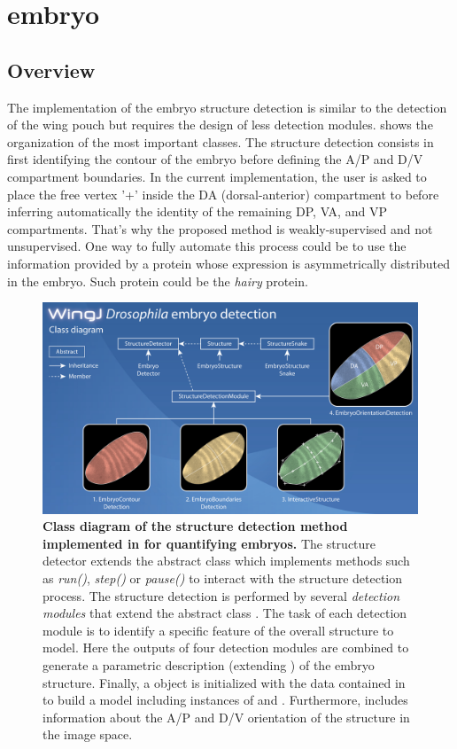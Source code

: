 \clearpage
\section{\droso embryo}
\subsection{Overview}
The implementation of the \droso embryo structure detection is similar to the detection of the wing pouch but requires the design of less detection modules.  shows the organization of the most important classes. The structure detection consists in first identifying the contour of the embryo before defining the A/P and D/V compartment boundaries. In the current implementation, the user is asked to place the free vertex '+' inside the DA (dorsal-anterior) compartment to before inferring automatically the identity of the remaining DP, VA, and VP compartments. That's why the proposed method is weakly-supervised and not unsupervised. One way to fully automate this process could be to use the information provided by a protein whose expression is asymmetrically distributed in the embryo. Such protein could be the \textit{hairy} protein.

\begin{figure}[h]
\centering
\includegraphics[width=146mm]{images/wingj-embryo-diagram_300dpi.jpg}
\caption{\textbf{Class diagram of the structure detection method implemented in \wingj for quantifying \droso embryos.} The structure detector \EmbryoStructureDetector extends the abstract class \StructureDetector which implements methods such as \textit{run()}, \textit{step()} or \textit{pause()} to interact with the structure detection process. The structure detection is performed by several \emph{detection modules} that extend the abstract class \StructureDetectionModule. The task of each detection module is to identify a specific feature of the overall structure to model. Here the outputs of four detection modules are combined to generate a parametric description (extending \EmbryoStructureSnake) of the embryo structure. Finally, a \EmbryoStructure object is initialized with the data contained in \EmbryoStructureSnake to build a model including instances of \Compartment and \Boundary. Furthermore, \EmbryoStructure includes information about the A/P and D/V orientation of the structure in the image space.}
\label{fig:embryo_diagram}
\end{figure}

